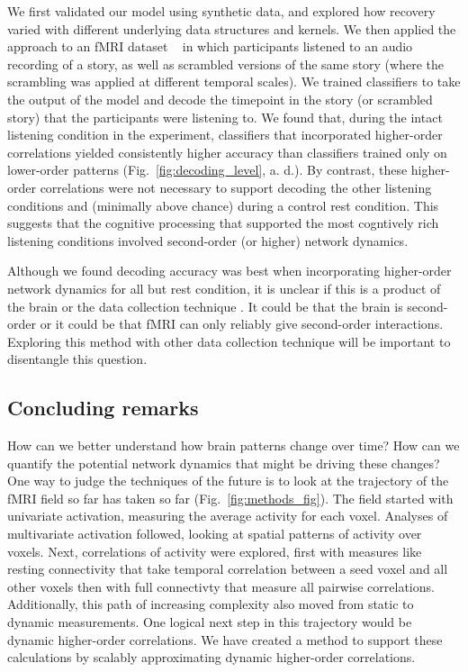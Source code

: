 \documentclass[english]{article}
\begin{document}
We first validated our model using synthetic data, and explored how
recovery varied with different underlying data structures and kernels.   We then 
applied the approach to an fMRI dataset
~\citep{SimoEtal16} in which participants listened to an audio
recording of a story, as well as scrambled versions of the same story
(where the scrambling was applied at different temporal scales).  We
trained classifiers to take the output of the model and decode the
timepoint in the story (or scrambled story) that the participants were
listening to. We found that, during the intact listening condition in the
experiment, classifiers that incorporated higher-order correlations
yielded consistently higher accuracy than classifiers trained only on
lower-order patterns (Fig.~\ref{fig:decoding_level},  a. d.).  By contrast, these
higher-order correlations were not necessary to support decoding the other
listening conditions and (minimally
above chance) during a control rest condition.  This suggests
that the cognitive processing that supported the most cogntively rich listening conditions
involved second-order (or higher) network dynamics.

Although we found decoding accuracy was best when incorporating
higher-order network dynamics for all but rest
  condition, it is unclear if this is a product of the brain or the
  data collection technique .  It could be that the brain is
  second-order or it could be that fMRI can
  only reliably give second-order interactions. Exploring this method
  with other data collection technique will be important to
  disentangle this question.



  \subsection*{Concluding remarks}

How can we better understand how brain patterns change over
time? How can we quantify the potential network dynamics that might be
driving these changes? One way to judge the techniques of the future is
to look at the trajectory of the fMRI field so far has taken so far
(Fig.~\ref{fig:methods_fig}).  The field started with 
univariate activation, measuring the average activity for each voxel.
Analyses of multivariate activation followed, looking at spatial patterns of
activity over voxels. Next, correlations of activity were explored, first
with measures like resting connectivity that take temporal correlation
between a seed voxel and all other voxels then with full connectivty
that measure all pairwise correlations.  Additionally, this path of increasing
complexity also moved from static to dynamic measurements.  One
logical next step in this trajectory would be dynamic higher-order
correlations. We have created a method 
to support these calculations by scalably approximating dynamic higher-order
correlations.  
\end{document}
